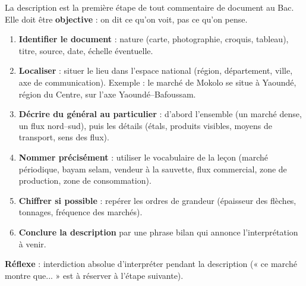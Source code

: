 \documentclass[11pt]{article}
\newcommand{\cle}[1]{{\popxbold\color{popdark}#1}}
\begin{document}
\begin{methode}
La description est la première étape de tout commentaire de document au Bac. Elle doit être \textbf{objective} : on dit ce qu'on voit, pas ce qu'on pense.
\begin{enumerate}
\item \textbf{Identifier le document} : nature (carte, photographie, croquis, tableau), titre, source, date, échelle éventuelle.
\item \textbf{Localiser} : situer le lieu dans l'espace national (région, département, ville, axe de communication). Exemple : le marché de Mokolo se situe à Yaoundé, région du Centre, sur l'axe Yaoundé--Bafoussam.
\item \textbf{Décrire du général au particulier} : d'abord l'ensemble (un marché dense, un flux nord--sud), puis les détails (étals, produits visibles, moyens de transport, sens des flux).
\item \textbf{Nommer précisément} : utiliser le vocabulaire de la leçon (\cle{marché périodique}, \cle{bayam selam}, \cle{vendeur à la sauvette}, \cle{flux commercial}, \cle{zone de production}, \cle{zone de consommation}).
\item \textbf{Chiffrer si possible} : repérer les ordres de grandeur (épaisseur des flèches, tonnages, fréquence des marchés).
\item \textbf{Conclure la description} par une phrase bilan qui annonce l'interprétation à venir.
\end{enumerate}
\textbf{Réflexe} : interdiction absolue d'interpréter pendant la description (« ce marché montre que... » est à réserver à l'étape suivante).
\end{methode}
\end{document}
